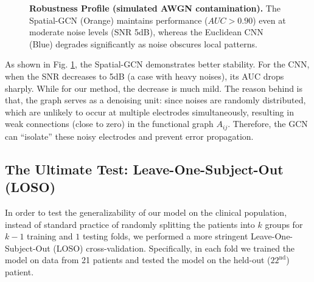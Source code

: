 \documentclass[journal]{IEEEtran}
\begin{document}
\begin{figure}[htbp]
\centering
{}
\caption{\textbf{Robustness Profile (simulated AWGN contamination).} The Spatial-GCN (Orange) maintains performance ($AUC > 0.90$) even at moderate noise levels (SNR 5dB), whereas the Euclidean CNN (Blue) degrades significantly as noise obscures local patterns.}
\label{fig:noise}
\end{figure}

As shown in Fig. \ref{fig:noise}, the Spatial-GCN demonstrates better stability. For the CNN, when the SNR decreases to 5dB (a case with heavy noises), its AUC drops sharply. While for our method, the decrease is much mild. The reason behind is that, the graph serves as a denoising unit: since noises are randomly distributed, which are unlikely to occur at multiple electrodes simultaneously, resulting in weak connections (close to zero) in the functional graph $A_{ij}$. Therefore, the GCN can ``isolate'' these noisy electrodes and prevent error propagation.

\subsection{The Ultimate Test: Leave-One-Subject-Out (LOSO)}
In order to test the generalizability of our model on the clinical population, instead of standard practice of randomly splitting the patients into $k$ groups for $k-1$ training and $1$ testing folds, we performed a more stringent Leave-One-Subject-Out (LOSO) cross-validation. Specifically, in each fold we trained the model on data from 21 patients and tested the model on the held-out ($22^{\text{nd}}$) patient.
\end{document}
